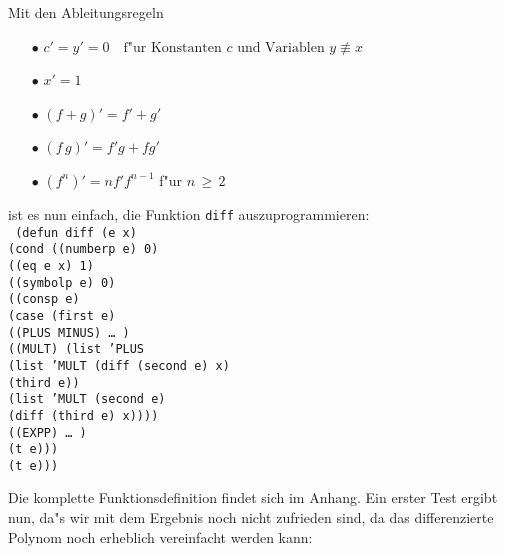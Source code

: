 Mit den Ableitungsregeln
\begin{itemize}
\item[$\bullet$] $c' = y' = 0\quad\mbox{f"ur Konstanten $c$ und
Variablen $y \not\equiv x$}$
\item[$\bullet$] $x' = 1$
\item[$\bullet$] $(f + g)' = f' + g'$
\item[$\bullet$] $(f\,g)' = f' g + f g'$
\item[$\bullet$] $(f^n)' = n f' f^{n-1}$ f"ur $n\,\ge\,2$
\end{itemize}
ist es nun einfach, die Funktion {\tt diff}
auszuprogrammieren:\\[0.1cm]

{\tt
(defun diff (e x)\\
\hspace*{2ex}(cond ((numberp e) 0)\\
\hspace*{9ex}((eq e x) 1)\\
\hspace*{9ex}((symbolp e) 0)\\
\hspace*{9ex}((consp e)\\
\hspace*{11ex}(case (first e)\\
\hspace*{13ex}((PLUS MINUS)\ \ldots\,)\\
\hspace*{13ex}((MULT) (list 'PLUS\\
\hspace*{24ex}(list 'MULT (diff (second e) x)\\
\hspace*{31ex}(third e))\\
\hspace*{24ex}(list 'MULT (second e)\\
\hspace*{31ex}(diff (third e) x))))\\
\hspace*{13ex}((EXPP)\ \ldots\,)\\
\hspace*{13ex}(t e)))\\
\hspace*{9ex}(t e)))
}

Die komplette Funktionsdefinition findet sich im Anhang.
Ein erster Test ergibt nun, da"s wir mit dem Ergebnis noch nicht
zufrieden sind, da das differenzierte Polynom noch erheblich vereinfacht
werden kann:

